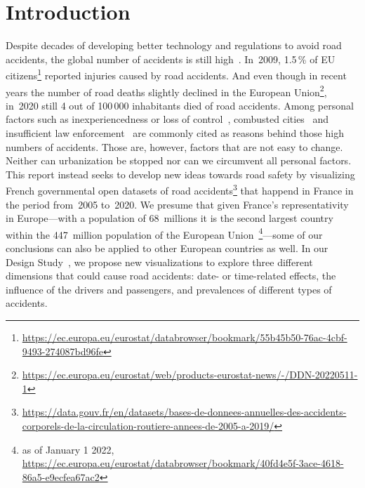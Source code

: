 \section{Introduction}
\label{introduction}
Despite decades of developing better technology and regulations to avoid road accidents, the global number of accidents is still high~\cite{Who2015}. In~2009, 1.5\,\% of EU citizens\footnote{\url{https://ec.europa.eu/eurostat/databrowser/bookmark/55b45b50-76ac-4cbf-9493-274087bd96fe}} reported injuries caused by road accidents. And even though in recent years the number of road deaths slightly declined in the European Union\footnote{\url{https://ec.europa.eu/eurostat/web/products-eurostat-news/-/DDN-20220511-1}}, in~2020 still 4 out of 100\,000 inhabitants died of road accidents. Among personal factors such as inexperiencedness or loss of control~\cite{RolisonRMF2018}, combusted cities~\cite{AlbalateF2021} and insufficient law enforcement~\cite{Who2015} are commonly cited as reasons behind those high numbers of accidents. Those are, however, factors that are not easy to change. Neither can urbanization be stopped nor can we circumvent all personal factors. This report instead seeks to develop new ideas towards road safety by visualizing French governmental open datasets of road accidents\footnote{\url{https://data.gouv.fr/en/datasets/bases-de-donnees-annuelles-des-accidents-corporels-de-la-circulation-routiere-annees-de-2005-a-2019/}} that happend in France in the period from~2005 to~2020. We presume that given France's representativity in Europe---with a population of 68~millions it is the second largest country within the 447~million population of the European Union~\footnote{as of January 1 2022, \url{https://ec.europa.eu/eurostat/databrowser/bookmark/40fd4e5f-3ace-4618-86a5-e9ecfea67ac2}}---some of our conclusions can also be applied to other European countries as well. In our Design Study~\cite{Munzner2008}, we propose new visualizations to explore three different dimensions that could cause road accidents: \Ni date- or time-related effects, \Nii the influence of the drivers and passengers, and \Niii prevalences of different types of accidents.

